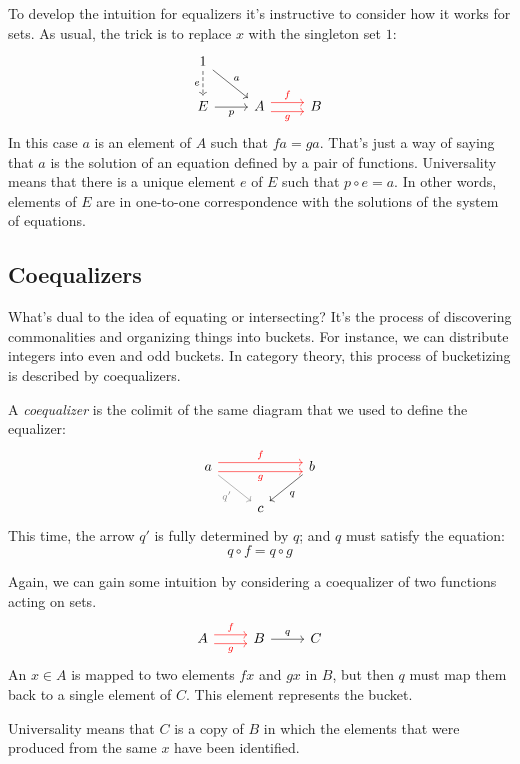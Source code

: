 \documentclass[DaoFP]{subfiles}
\begin{document}
To develop the intuition for equalizers it's instructive to consider how it works for sets. As usual, the trick is to replace $x$ with the singleton set $1$:
\[
\begin{tikzcd}
1
\arrow[d, dashed, "e"']
\arrow[dr, "a"]
\\
E
\arrow[r, "p"']
&
A \arrow[r, red, shift left=0.75ex, "f"]
  \arrow[r, red, shift right=0.75ex, "g"']
&
B
\end{tikzcd}
\]
In this case $a$ is an element of $A$ such that $f a = g a$. That's just a way of saying that $a$ is the solution of an equation defined by a pair of functions. Universality means that there is a unique element $e$ of $E$ such that $p \circ e = a$. In other words, elements of $E$ are in one-to-one correspondence with the solutions of the system of equations. 

\subsection{Coequalizers}

What's dual to the idea of equating or intersecting? It's the process of discovering commonalities and organizing things into buckets. For instance, we can distribute integers into even and odd buckets. In category theory, this process of bucketizing is described by coequalizers.

A \emph{coequalizer} is the colimit of the same diagram that we used to define the equalizer:
\[
\begin{tikzcd}
a 
\arrow[rr, red, shift left=.75ex, "f"]
\arrow[rr, red, shift right=.75ex, "g"']
\arrow[rd, gray, "q'"']
&&
b
\arrow[ld, "q"]
\\
& c
\end{tikzcd}
\]
This time, the arrow $q'$ is fully determined by $q$; and $q$ must satisfy the equation:
\[ q \circ f = q \circ g \]

Again, we can gain some intuition by considering a coequalizer of two functions acting on sets. 
\[
\begin{tikzcd}
A
\arrow[r, red, shift left=.75ex, "f"]
\arrow[r, red, shift right=.75ex, "g"']
&
B
\arrow[r, "q"]
& C
\end{tikzcd}
\]
An $x \in A$ is mapped to two elements $f x$ and $g x$ in $B$, but then $q$ must map them back to a single element of $C$. This element represents the bucket. 

Universality means that $C$ is a copy of $B$ in which the elements that were produced from the same $x$ have been identified.
\end{document}

